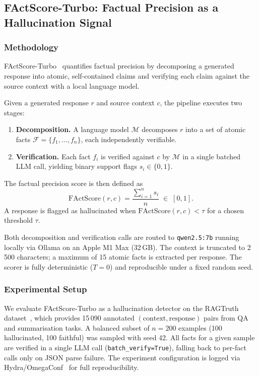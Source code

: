 \subsection{FActScore-Turbo: Factual Precision as a Hallucination Signal}
\label{sec:factscore_turbo}

\subsubsection{Methodology}

FActScore-Turbo~\cite{factscore_turbo_vk} quantifies factual precision by decomposing a
generated response into atomic, self-contained claims and verifying each claim against the
source context with a local language model.

Given a generated response $r$ and source context $c$, the pipeline executes two stages:

\begin{enumerate}
    \item \textbf{Decomposition.} A language model $\mathcal{M}$ decomposes $r$ into a set
          of atomic facts $\mathcal{F} = \{f_1, \dots, f_n\}$, each independently verifiable.
    \item \textbf{Verification.} Each fact $f_i$ is verified against $c$ by $\mathcal{M}$ in
          a single batched LLM call, yielding binary support flags $s_i \in \{0, 1\}$.
\end{enumerate}

The factual precision score is then defined as
\[
  \text{FActScore}(r, c) = \frac{\sum_{i=1}^{n} s_i}{n} \;\in\; [0, 1].
\]
A response is flagged as hallucinated when $\text{FActScore}(r, c) < \tau$ for a chosen
threshold $\tau$.

Both decomposition and verification calls are routed to \texttt{qwen2.5:7b} running locally
via Ollama on an Apple M1 Max (32\,GB).  The context is truncated to 2\,500 characters; a
maximum of 15 atomic facts is extracted per response.  The scorer is fully deterministic
($T = 0$) and reproducible under a fixed random seed.

\subsubsection{Experimental Setup}

We evaluate FActScore-Turbo as a hallucination detector on the RAGTruth
dataset~\cite{ragtruth}, which provides 15\,090 annotated $(\text{context}, \text{response})$
pairs from QA and summarisation tasks.  A balanced subset of $n = 200$ examples (100
hallucinated, 100 faithful) was sampled with seed 42.  All facts for a given sample are
verified in a single LLM call (\texttt{batch\_verify=True}), falling back to per-fact calls
only on JSON parse failure.  The experiment configuration is logged via
Hydra/OmegaConf~\cite{hydra} for full reproducibility.

